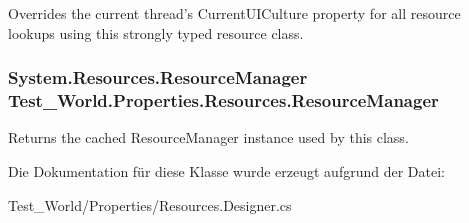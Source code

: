 Overrides the current thread's CurrentUICulture property for all resource lookups using this strongly typed resource class. 

\hypertarget{class_test___world_1_1_properties_1_1_resources_a53b3f19f3590b7cf48b3bfbf1a343023}{
\subsubsection[{ResourceManager}]{\setlength{\rightskip}{0pt plus 5cm}System.Resources.ResourceManager Test\_\-World.Properties.Resources.ResourceManager}}
\label{class_test___world_1_1_properties_1_1_resources_a53b3f19f3590b7cf48b3bfbf1a343023}


Returns the cached ResourceManager instance used by this class. 



Die Dokumentation für diese Klasse wurde erzeugt aufgrund der Datei:\begin{DoxyCompactItemize}
\item 
Test\_\-World/Properties/Resources.Designer.cs\end{DoxyCompactItemize}

